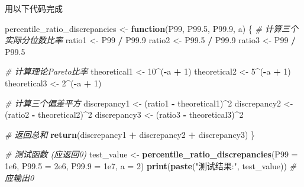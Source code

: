 \documentclass[
]{article}
\newenvironment{Shaded}{\begin{snugshade}}{\end{snugshade}}
\newcommand{\AttributeTok}[1]{\textcolor[rgb]{0.13,0.29,0.53}{#1}}
\newcommand{\CommentTok}[1]{\textcolor[rgb]{0.56,0.35,0.01}{\textit{#1}}}
\newcommand{\ControlFlowTok}[1]{\textcolor[rgb]{0.13,0.29,0.53}{\textbf{#1}}}
\newcommand{\DecValTok}[1]{\textcolor[rgb]{0.00,0.00,0.81}{#1}}
\newcommand{\FloatTok}[1]{\textcolor[rgb]{0.00,0.00,0.81}{#1}}
\newcommand{\FunctionTok}[1]{\textcolor[rgb]{0.13,0.29,0.53}{\textbf{#1}}}
\newcommand{\NormalTok}[1]{#1}
\newcommand{\OtherTok}[1]{\textcolor[rgb]{0.56,0.35,0.01}{#1}}
\newcommand{\SpecialCharTok}[1]{\textcolor[rgb]{0.81,0.36,0.00}{\textbf{#1}}}
\newcommand{\StringTok}[1]{\textcolor[rgb]{0.31,0.60,0.02}{#1}}
\begin{document}
用以下代码完成

\begin{Shaded}
\begin{Highlighting}[]
\NormalTok{percentile\_ratio\_discrepancies }\OtherTok{\textless{}{-}} \ControlFlowTok{function}\NormalTok{(P99, P99}\FloatTok{.5}\NormalTok{, P99}\FloatTok{.9}\NormalTok{, a) \{}
  \CommentTok{\# 计算三个实际分位数比率}
\NormalTok{  ratio1 }\OtherTok{\textless{}{-}}\NormalTok{ P99 }\SpecialCharTok{/}\NormalTok{ P99}\FloatTok{.9}
\NormalTok{  ratio2 }\OtherTok{\textless{}{-}}\NormalTok{ P99}\FloatTok{.5} \SpecialCharTok{/}\NormalTok{ P99}\FloatTok{.9}
\NormalTok{  ratio3 }\OtherTok{\textless{}{-}}\NormalTok{ P99 }\SpecialCharTok{/}\NormalTok{ P99}\FloatTok{.5}
  
  \CommentTok{\# 计算理论Pareto比率}
\NormalTok{  theoretical1 }\OtherTok{\textless{}{-}} \DecValTok{10}\SpecialCharTok{\^{}}\NormalTok{(}\SpecialCharTok{{-}}\NormalTok{a }\SpecialCharTok{+} \DecValTok{1}\NormalTok{)}
\NormalTok{  theoretical2 }\OtherTok{\textless{}{-}} \DecValTok{5}\SpecialCharTok{\^{}}\NormalTok{(}\SpecialCharTok{{-}}\NormalTok{a }\SpecialCharTok{+} \DecValTok{1}\NormalTok{)}
\NormalTok{  theoretical3 }\OtherTok{\textless{}{-}} \DecValTok{2}\SpecialCharTok{\^{}}\NormalTok{(}\SpecialCharTok{{-}}\NormalTok{a }\SpecialCharTok{+} \DecValTok{1}\NormalTok{)}
  
  \CommentTok{\# 计算三个偏差平方}
\NormalTok{  discrepancy1 }\OtherTok{\textless{}{-}}\NormalTok{ (ratio1 }\SpecialCharTok{{-}}\NormalTok{ theoretical1)}\SpecialCharTok{\^{}}\DecValTok{2}
\NormalTok{  discrepancy2 }\OtherTok{\textless{}{-}}\NormalTok{ (ratio2 }\SpecialCharTok{{-}}\NormalTok{ theoretical2)}\SpecialCharTok{\^{}}\DecValTok{2}
\NormalTok{  discrepancy3 }\OtherTok{\textless{}{-}}\NormalTok{ (ratio3 }\SpecialCharTok{{-}}\NormalTok{ theoretical3)}\SpecialCharTok{\^{}}\DecValTok{2}
  
  \CommentTok{\# 返回总和}
  \FunctionTok{return}\NormalTok{(discrepancy1 }\SpecialCharTok{+}\NormalTok{ discrepancy2 }\SpecialCharTok{+}\NormalTok{ discrepancy3)}
\NormalTok{\}}

\CommentTok{\# 测试函数 (应返回0)}
\NormalTok{test\_value }\OtherTok{\textless{}{-}} \FunctionTok{percentile\_ratio\_discrepancies}\NormalTok{(}\AttributeTok{P99 =} \FloatTok{1e6}\NormalTok{, }\AttributeTok{P99.5 =} \FloatTok{2e6}\NormalTok{, }\AttributeTok{P99.9 =} \FloatTok{1e7}\NormalTok{, }\AttributeTok{a =} \DecValTok{2}\NormalTok{)}
\FunctionTok{print}\NormalTok{(}\FunctionTok{paste}\NormalTok{(}\StringTok{"测试结果:"}\NormalTok{, test\_value))  }\CommentTok{\# 应输出0}
\end{Highlighting}
\end{Shaded}
\end{document}
